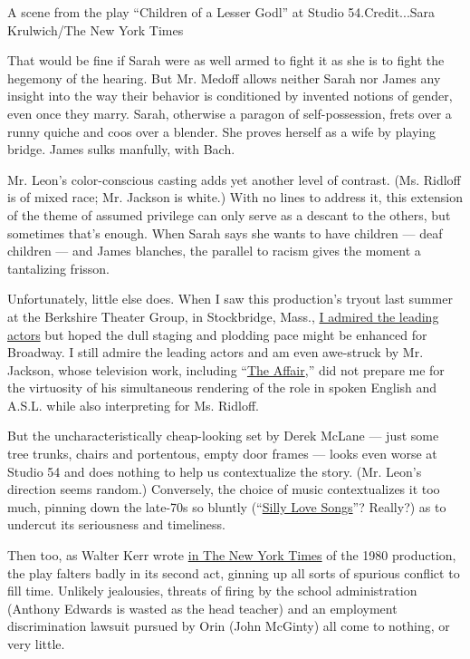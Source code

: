 A scene from the play ``Children of a Lesser Godl'' at Studio
54.Credit...Sara Krulwich/The New York Times

That would be fine if Sarah were as well armed to fight it as she is to
fight the hegemony of the hearing. But Mr. Medoff allows neither Sarah
nor James any insight into the way their behavior is conditioned by
invented notions of gender, even once they marry. Sarah, otherwise a
paragon of self-possession, frets over a runny quiche and coos over a
blender. She proves herself as a wife by playing bridge. James sulks
manfully, with Bach.

Mr. Leon's color-conscious casting adds yet another level of contrast.
(Ms. Ridloff is of mixed race; Mr. Jackson is white.) With no lines to
address it, this extension of the theme of assumed privilege can only
serve as a descant to the others, but sometimes that's enough. When
Sarah says she wants to have children --- deaf children --- and James
blanches, the parallel to racism gives the moment a tantalizing frisson.

Unfortunately, little else does. When I saw this production's tryout
last summer at the Berkshire Theater Group, in Stockbridge, Mass.,
\href{https://www.nytimes3xbfgragh.onion/2017/07/05/theater/in-a-summer-theater-weekend-odd-couples-and-immigrants-on-the-make.html}{I
admired the leading actors} but hoped the dull staging and plodding pace
might be enhanced for Broadway. I still admire the leading actors and am
even awe-struck by Mr. Jackson, whose television work, including
``\href{https://www.nytimes3xbfgragh.onion/2014/10/10/arts/television/the-affair-on-showtime-stars-dominic-west-and-ruth-wilson.html}{The
Affair},'' did not prepare me for the virtuosity of his simultaneous
rendering of the role in spoken English and A.S.L. while also
interpreting for Ms. Ridloff.

But the uncharacteristically cheap-looking set by Derek McLane --- just
some tree trunks, chairs and portentous, empty door frames --- looks
even worse at Studio 54 and does nothing to help us contextualize the
story. (Mr. Leon's direction seems random.) Conversely, the choice of
music contextualizes it too much, pinning down the late-70s so bluntly
(``\href{https://www.youtube.com/watch?v=ap87QgZKTNw}{Silly Love
Songs}''? Really?) as to undercut its seriousness and timeliness.

Then too, as Walter Kerr wrote
\href{http://www.nytimes3xbfgragh.onion/packages/pdf/theater/112149885.pdf}{in
The New York Times} of the 1980 production, the play falters badly in
its second act, ginning up all sorts of spurious conflict to fill time.
Unlikely jealousies, threats of firing by the school administration
(Anthony Edwards is wasted as the head teacher) and an employment
discrimination lawsuit pursued by Orin (John McGinty) all come to
nothing, or very little.

